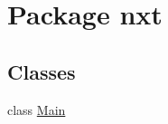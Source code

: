 \hypertarget{namespacenxt}{\section{Package nxt}
\label{namespacenxt}
}
\subsection*{Classes}
\begin{DoxyCompactItemize}
\item 
class \hyperlink{classnxt_1_1_main}{Main}
\end{DoxyCompactItemize}
